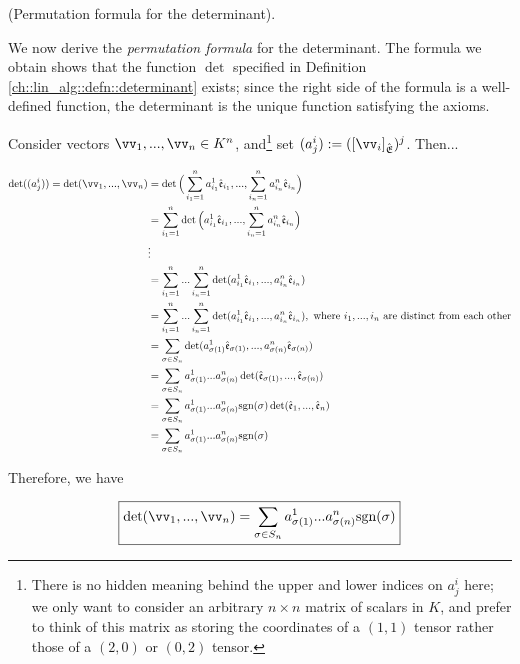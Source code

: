 \begin{deriv}
\label{ch::lin_alg::deriv::permutation_formula_for_determinant}
    (Permutation formula for the determinant).
    
    We now derive the \textit{permutation formula} for the determinant. The formula we obtain shows that the function $\det$ specified in Definition \ref{ch::lin_alg::defn::determinant} exists; since the right side of the formula is a well-defined function, the determinant is the unique function satisfying the axioms.
    
    Consider vectors $\vv_1, ..., \vv_n \in K^n$, and\footnote{There is no hidden meaning behind the upper and lower indices on $a^i_j$ here; we only want to consider an arbitrary $n \times n$ matrix of scalars in $K$, and prefer to think of this matrix as storing the coordinates of a $(1, 1)$ tensor rather those of a $(2, 0)$ or $(0, 2)$ tensor.} set $(a^i_j) := ([\vv_i]_\sE)^j$. Then...
    
    \begin{align*}
        \det((a^i_j)) = \det(\vv_1, ..., \vv_n)
        &= \det \Big(\sum_{i_1 = 1}^n a^1_{i_1} \see_{i_1}, ..., \sum_{i_n = 1}^n a^n_{i_n} \see_{i_n} \Big) \\
        &= \sum_{i_1 = 1}^n \det \Big( a^1_{i_1} \see_{i_1}, ..., \sum_{i_n = 1}^n a^n_{i_n} \see_{i_n} \Big) \\
        &\vdots \\
        &= \sum_{i_1 = 1}^n ... \sum_{i_n = 1}^n \det(a^1_{i_1} \see_{i_1}, ..., a^n_{i_n} \see_{i_n}) \\
        &= \sum_{i_1 = 1}^n ... \sum_{i_n = 1}^n \det(a^1_{i_1} \see_{i_1}, ..., a^n_{i_n} \see_{i_n}), \text{ where $i_1, ..., i_n$ are distinct from each other} \\
        &= \sum_{\sigma \in S_n}
        \det(a^1_{\sigma(1)} \see_{\sigma(1)}, ..., a^n_{\sigma(n)} \see_{\sigma(n)}) \\
        &= \sum_{\sigma \in S_n}
        a^1_{\sigma(1)} ... a^n_{\sigma(n)} \det(\see_{\sigma(1)}, ..., \see_{\sigma(n)}) \\
        &= \sum_{\sigma \in S_n} a^1_{\sigma(1)} ... a^n_{\sigma(n)} \text{sgn}(\sigma)
        \det(\see_1, ..., \see_n) \\
        &= \sum_{\sigma \in S_n} a^1_{\sigma(1)} ... a^n_{\sigma(n)} \text{sgn}(\sigma)
    \end{align*}
    
    Therefore, we have
    
    \begin{align*}
        \boxed
        {
            \det(\vv_1, ..., \vv_n) = \sum_{\sigma \in S_n} a^1_{\sigma(1)} ... a^n_{\sigma(n)} \sgn(\sigma)
        }
    \end{align*}
    

\end{deriv}
